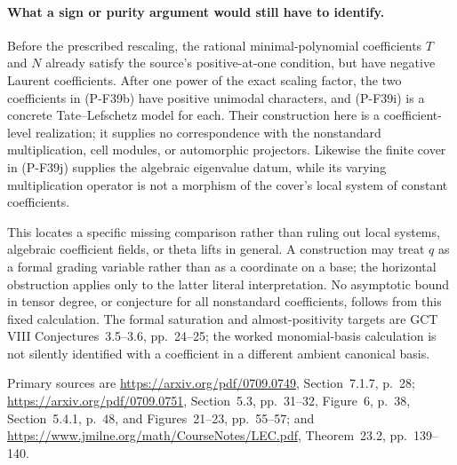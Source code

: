 \paragraph{What a sign or purity argument would still have to identify.}
Before the prescribed rescaling, the rational minimal-polynomial
coefficients $T$ and $N$ already satisfy the source's positive-at-one
condition, but have negative Laurent coefficients. After one power
of the exact scaling factor, the two coefficients in (P-F39b)
have positive unimodal characters, and (P-F39i) is a concrete
Tate--Lefschetz model for each. Their construction here is a
coefficient-level realization; it supplies no correspondence
with the nonstandard multiplication, cell modules, or automorphic
projectors. Likewise the finite cover in (P-F39j) supplies the
algebraic eigenvalue datum, while its varying multiplication
operator is not a morphism of the cover's local system of
constant coefficients.

This locates a specific missing comparison rather than ruling
out local systems, algebraic coefficient fields, or theta lifts
in general. A construction may treat $q$ as a formal grading
variable rather than as a coordinate on a base; the horizontal
obstruction applies only to the latter literal interpretation.
No asymptotic bound in tensor degree, or conjecture for all
nonstandard coefficients, follows from this fixed calculation.
The formal saturation and almost-positivity targets are
GCT VIII Conjectures~3.5--3.6, pp.~24--25; the worked
monomial-basis calculation is not silently identified with a
coefficient in a different ambient canonical basis.

Primary sources are
\url{https://arxiv.org/pdf/0709.0749}, Section~7.1.7, p.~28;
\url{https://arxiv.org/pdf/0709.0751}, Section~5.3, pp.~31--32,
Figure~6, p.~38, Section~5.4.1, p.~48, and Figures~21--23,
pp.~55--57; and
\url{https://www.jmilne.org/math/CourseNotes/LEC.pdf},
Theorem~23.2, pp.~139--140.
